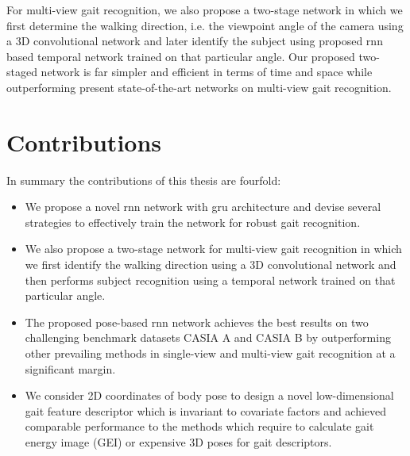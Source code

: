For multi-view gait recognition, we also propose a two-stage network in which we first determine the walking direction, i.e. the viewpoint angle of the camera using a 3D convolutional network and later identify the subject using proposed \gls{rnn} based temporal network trained on that particular angle. Our proposed two-staged network is far simpler and efficient in terms of time and space while outperforming present state-of-the-art networks on multi-view gait recognition.


\section{Contributions}
In summary the contributions of this thesis are fourfold:
\begin{itemize}
\item We propose a novel \gls{rnn} network with \gls{gru} architecture and devise several strategies to effectively train the network for robust gait recognition. 

\item We also propose a two-stage network for multi-view gait recognition in which we first identify the walking direction using a 3D convolutional network and then performs subject recognition using a temporal network trained on that particular angle.

\item The proposed pose-based \gls{rnn} network achieves the best results on two challenging benchmark datasets CASIA A and CASIA B by outperforming other prevailing methods in single-view and multi-view gait recognition at a significant margin.

\item We consider 2D coordinates of body pose to design a novel low-dimensional gait feature descriptor which is invariant to covariate factors and achieved comparable performance to the methods which require to calculate gait energy image (GEI) or expensive 3D poses for gait descriptors.
\end{itemize}


